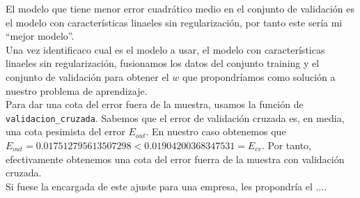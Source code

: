 \documentclass{article}
\begin{document}
El modelo que tiene menor error cuadrático medio en el conjunto de validación es el modelo con características linaeles sin regularización, por tanto este sería mi ``mejor modelo''.\\

Una vez identificaco cual es el modelo a usar, el modelo con características linaeles sin regularización, fusionamos los datos del conjunto training y el conjunto de validación para obtener el $w$ que propondríamos como solución a nuestro problema de aprendizaje.\\

Para dar una cota del error fuera de la muestra, usamos la función de \texttt{validacion\_cruzada}. Sabemos que el error de validación cruzada es, en media, una cota pesimista del error $E_{out}$. En nuestro caso obtenemos que $E_{out} = 0.017512795613507298 < 0.01904200368347531 = E_{cv}$. Por tanto, efectivamente obtenemos una cota del error fuerra de la muestra con validación cruzada.\\

Si fuese la encargada de este ajuste para una empresa, les propondría el ....
\end{document}
